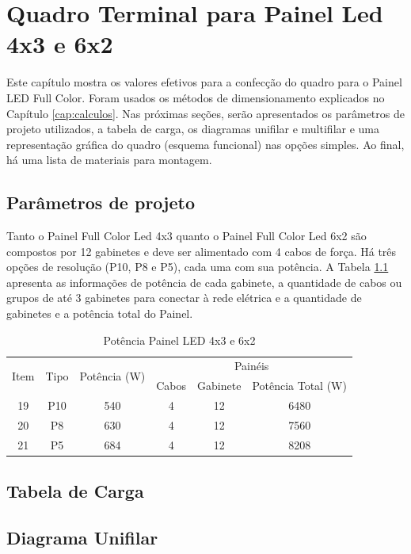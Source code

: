 \chapter{Quadro Terminal para Painel Led 4x3 e 6x2}

Este capítulo mostra os valores efetivos para a confecção do quadro para o Painel LED Full Color. Foram usados os métodos de dimensionamento explicados no Capítulo \ref{cap:calculos}. Nas próximas seções, serão apresentados os parâmetros de projeto utilizados, a tabela de carga, os diagramas unifilar e multifilar e uma representação gráfica do quadro (esquema funcional) nas opções simples. Ao final, há uma lista de materiais para montagem.

\section{Parâmetros de projeto}

Tanto o Painel Full Color Led 4x3 quanto o Painel Full Color Led 6x2 são compostos por 12 gabinetes e deve ser alimentado com 4 cabos de força. Há três opções de resolução (P10, P8 e P5), cada uma com sua potência. A Tabela \ref{tab:pot_4x3} apresenta as informações de potência de cada gabinete, a quantidade de cabos ou grupos de até 3 gabinetes para conectar à rede elétrica e a quantidade de gabinetes e a potência total do Painel.

\begin{table}[htbp]
\caption{Potência Painel LED 4x3 e 6x2}
\centering
\begin{tabular}{cccccc}
\toprule
\multirow{2}{*}{Item} & \multirow{2}{*}{Tipo} & \multirow{2}{*}{Potência (W)} & \multicolumn{3}{c}{Painéis} \\
\cmidrule{4-6}
& & & Cabos  & Gabinete & Potência Total (W) \\
\midrule


19 & P10 & 540 & 4 & 12 & 6480 \\
20 & P8 & 630 & 4 & 12 & 7560 \\
21 & P5 & 684 & 4 & 12 & 8208 \\


\bottomrule
\end{tabular}
\label{tab:pot_4x3}
\end{table}


\section{Tabela de Carga}
\section{Diagrama Unifilar}

